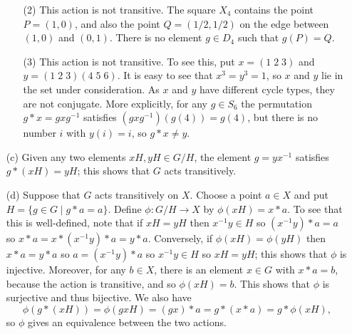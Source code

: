 \documentclass{amsart}
\newcommand{\xra}{\xrightarrow}
\renewcommand{\:}{\colon}
\newcommand{\st}{\;|\;}
\theoremstyle{definition}
\newenvironment{solution}{{\noindent\bf Solution:}}{}
\begin{document}
\begin{solution}
\begin{itemize}
\begin{itemize}
  \item[(2)] This action is not transitive.  The square $X_4$ contains
   the point $P=(1,0)$, and also the point $Q=(1/2,1/2)$ on the edge
   between $(1,0)$ and $(0,1)$.  There is no element $g\in D_4$ such
   that $g(P)=Q$.
  \item[(3)] This action is not transitive.  To see this, put
   $x=(1\;2\;3)$ and $y=(1\;2\;3)(4\;5\;6)$.  It is easy to see that
   $x^3=y^3=1$, so $x$ and $y$ lie in the set under consideration.  As
   $x$ and $y$ have different cycle types, they are not conjugate.
   More explicitly, for any $g\in S_6$ the permutation $g*x=gxg^{-1}$
   satisfies $(gxg^{-1})(g(4))=g(4)$, but there is no number $i$ with
   $y(i)=i$, so $g*x\neq y$.   
 \end{itemize}
 \item[(c)] Given any two elements $xH,yH\in G/H$, the element
  $g=yx^{-1}$ satisfies $g*(xH)=yH$; this shows that $G$ acts
  transitively. 
 \item[(d)] Suppose that $G$ acts transitively on $X$.  Choose a point
  $a\in X$ and put $H=\{g\in G\st g*a=a\}$.  Define $\phi\:G/H\xra{}X$
  by $\phi(xH)=x*a$.  To see that this is well-defined, note that if
  $xH=yH$ then $x^{-1}y\in H$ so $(x^{-1}y)*a=a$ so
  $x*a=x*(x^{-1}y)*a=y*a$.  Conversely, if $\phi(xH)=\phi(yH)$ then
  $x*a=y*a$ so $a=(x^{-1}y)*a$ so $x^{-1}y\in H$ so $xH=yH$; this
  shows that $\phi$ is injective.  Moreover, for any $b\in X$, there
  is an element $x\in G$ with $x*a=b$, because the action is
  transitive, and so $\phi(xH)=b$.  This shows that $\phi$ is
  surjective and thus bijective.  We also have 
  \[ \phi(g*(xH))=\phi(gxH)=(gx)*a=g*(x*a)=g*\phi(xH), \]
  so $\phi$ gives an equivalence between the two actions.
\end{itemize}
\end{solution}
\end{document}
